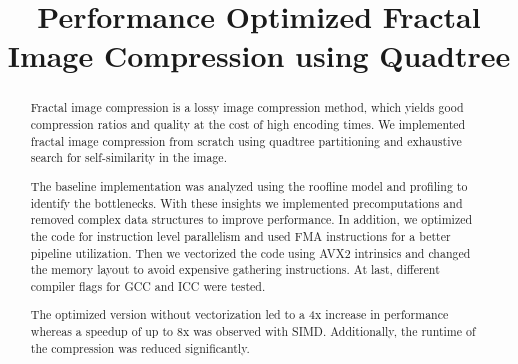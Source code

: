 \documentclass[letterpaper]{article}
\title{Performance Optimized Fractal Image Compression using Quadtree}
\begin{document}
%
\maketitle
%
%

\setlength{\abovedisplayskip}{1ex}
\setlength{\belowdisplayskip}{1ex}

\begin{abstract}
  Fractal image compression is a lossy image compression method, which yields
  good compression ratios and quality at the cost of high encoding times. We
  implemented fractal image compression from scratch using quadtree partitioning
  and exhaustive search for self-similarity in the image.

  The baseline implementation was analyzed using the roofline model and
  profiling to identify the bottlenecks. With these insights we implemented
  precomputations and removed complex data structures to improve performance. In
  addition, we optimized the code for instruction level parallelism and used FMA
  instructions for a better pipeline utilization. Then we vectorized the code
  using AVX2 intrinsics and changed the memory layout to avoid expensive
  gathering instructions. At last, different compiler flags for GCC and ICC were
  tested.

  The optimized version without vectorization led to a 4x increase in
  performance whereas a speedup of up to 8x was observed with SIMD.
  Additionally, the runtime of the compression was reduced significantly.

\end{abstract}










\end{document}
